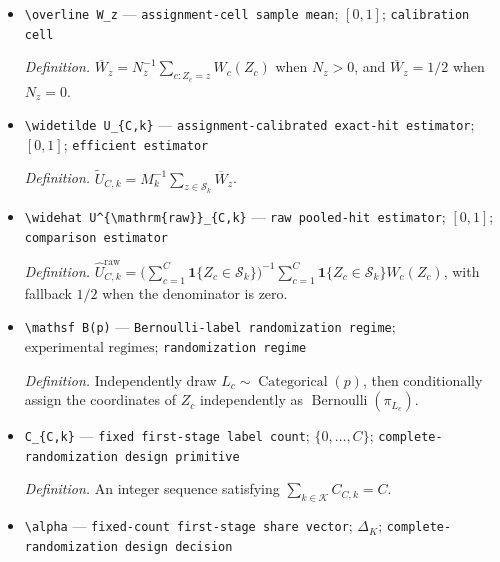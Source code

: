 \documentclass{article}
\begin{document}
\begin{itemize}
  \par\smallskip\noindent\emph{Definition.} \(N_z=\sum_{c=1}^C\mathbf 1\{Z_c=z\}\).
  \item \texttt{\textbackslash{}\allowbreak{}overline W\_\allowbreak{}z} --- \texttt{assignment-\allowbreak{}cell sample mean}; \([0,1]\); \texttt{calibration cell}
  \par\smallskip\noindent\emph{Definition.} \(\overline W_z=N_z^{-1}\sum_{c:Z_c=z}W_c(Z_c)\) when \(N_z>0\), and \(\overline W_z=1/2\) when \(N_z=0\).
  \item \texttt{\textbackslash{}\allowbreak{}widetilde U\_\allowbreak{}\{C,\allowbreak{}k\}\allowbreak{}} --- \texttt{assignment-\allowbreak{}calibrated exact-\allowbreak{}hit estimator}; \([0,1]\); \texttt{efficient estimator}
  \par\smallskip\noindent\emph{Definition.} \(\widetilde U_{C,k}=M_k^{-1}\sum_{z\in\mathcal S_k}\overline W_z\).
  \item \texttt{\textbackslash{}\allowbreak{}widehat U\textasciicircum{}\{\textbackslash{}\allowbreak{}mathrm\{raw\}\allowbreak{}\}\allowbreak{}\_\allowbreak{}\{C,\allowbreak{}k\}\allowbreak{}} --- \texttt{raw pooled-\allowbreak{}hit estimator}; \([0,1]\); \texttt{comparison estimator}
  \par\smallskip\noindent\emph{Definition.} \(\widehat U^{\mathrm{raw}}_{C,k}=\bigl(\sum_{c=1}^C\mathbf 1\{Z_c\in\mathcal S_k\}\bigr)^{-1}\sum_{c=1}^C\mathbf 1\{Z_c\in\mathcal S_k\}W_c(Z_c)\), with fallback \(1/2\) when the denominator is zero.
  \item \texttt{\textbackslash{}\allowbreak{}mathsf B(p)} --- \texttt{Bernoulli-\allowbreak{}label randomization regime}; \(\text{experimental regimes}\); \texttt{randomization regime}
  \par\smallskip\noindent\emph{Definition.} Independently draw \(L_c\sim\operatorname{Categorical}(p)\), then conditionally assign the coordinates of \(Z_c\) independently as \(\operatorname{Bernoulli}(\pi_{L_c})\).
  \item \texttt{C\_\allowbreak{}\{C,\allowbreak{}k\}\allowbreak{}} --- \texttt{fixed first-\allowbreak{}stage label count}; \(\{0,\ldots,C\}\); \texttt{complete-\allowbreak{}randomization design primitive}
  \par\smallskip\noindent\emph{Definition.} An integer sequence satisfying \(\sum_{k\in\mathcal K}C_{C,k}=C\).
  \item \texttt{\textbackslash{}\allowbreak{}alpha} --- \texttt{fixed-\allowbreak{}count first-\allowbreak{}stage share vector}; \(\Delta_K\); \texttt{complete-\allowbreak{}randomization design decision}

\end{itemize}
\end{document}
